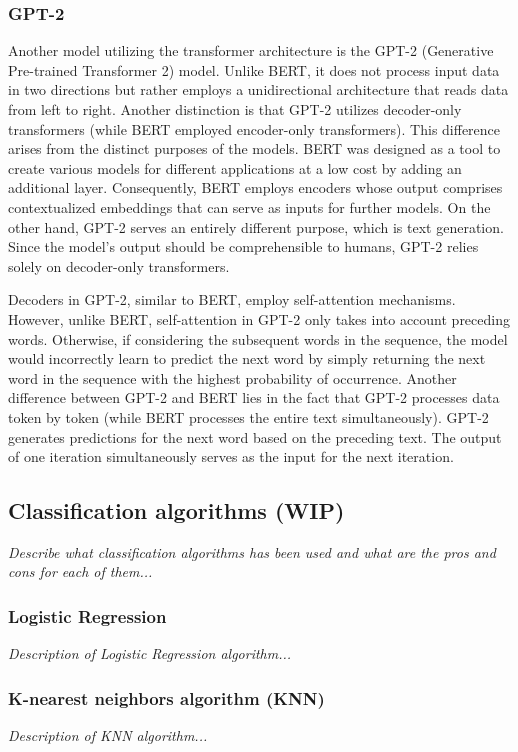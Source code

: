 \subsubsection{GPT-2}
Another model utilizing the transformer architecture is the GPT-2 (Generative Pre-trained Transformer 2) model. Unlike BERT, it does not process input data in two directions but rather employs a unidirectional architecture that reads data from left to right. Another distinction is that GPT-2 utilizes decoder-only transformers (while BERT employed encoder-only transformers). This difference arises from the distinct purposes of the models. BERT was designed as a tool to create various models for different applications at a low cost by adding an additional layer. Consequently, BERT employs encoders whose output comprises contextualized embeddings that can serve as inputs for further models. On the other hand, GPT-2 serves an entirely different purpose, which is text generation. Since the model's output should be comprehensible to humans, GPT-2 relies solely on decoder-only transformers.

Decoders in GPT-2, similar to BERT, employ self-attention mechanisms. However, unlike BERT, self-attention in GPT-2 only takes into account preceding words. Otherwise, if considering the subsequent words in the sequence, the model would incorrectly learn to predict the next word by simply returning the next word in the sequence with the highest probability of occurrence. Another difference between GPT-2 and BERT lies in the fact that GPT-2 processes data token by token (while BERT processes the entire text simultaneously). GPT-2 generates predictions for the next word based on the preceding text. The output of one iteration simultaneously serves as the input for the next iteration.


\subsection{Classification algorithms (WIP)}
\textit{Describe what classification algorithms has been used and what are the pros and cons for each of them...}

\subsubsection{Logistic Regression}
\textit{Description of Logistic Regression algorithm...}

\subsubsection{K-nearest neighbors algorithm (KNN)}
\textit{Description of KNN algorithm...}

